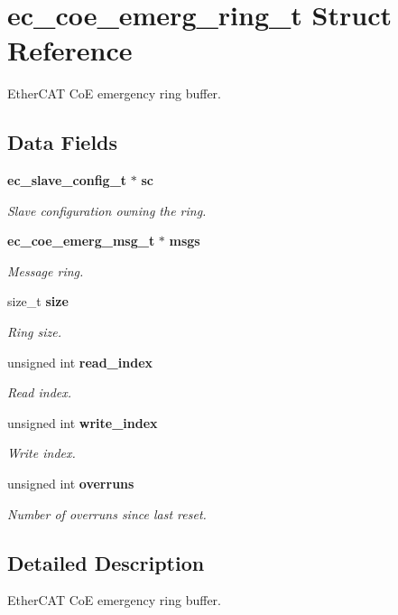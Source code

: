 \section{ec\-\_\-coe\-\_\-emerg\-\_\-ring\-\_\-t \-Struct \-Reference}
\label{structec__coe__emerg__ring__t}


\-Ether\-C\-A\-T \-Co\-E emergency ring buffer.  


\subsection*{\-Data \-Fields}
\begin{DoxyCompactItemize}
\item 
{\bf ec\-\_\-slave\-\_\-config\-\_\-t} $\ast$ {\bf sc}
\begin{DoxyCompactList}\small\item\em \-Slave configuration owning the ring. \end{DoxyCompactList}\item 
{\bf ec\-\_\-coe\-\_\-emerg\-\_\-msg\-\_\-t} $\ast$ {\bf msgs}
\begin{DoxyCompactList}\small\item\em \-Message ring. \end{DoxyCompactList}\item 
size\-\_\-t {\bf size}
\begin{DoxyCompactList}\small\item\em \-Ring size. \end{DoxyCompactList}\item 
unsigned int {\bf read\-\_\-index}
\begin{DoxyCompactList}\small\item\em \-Read index. \end{DoxyCompactList}\item 
unsigned int {\bf write\-\_\-index}
\begin{DoxyCompactList}\small\item\em \-Write index. \end{DoxyCompactList}\item 
unsigned int {\bf overruns}
\begin{DoxyCompactList}\small\item\em \-Number of overruns since last reset. \end{DoxyCompactList}\end{DoxyCompactItemize}


\subsection{\-Detailed \-Description}
\-Ether\-C\-A\-T \-Co\-E emergency ring buffer. 


